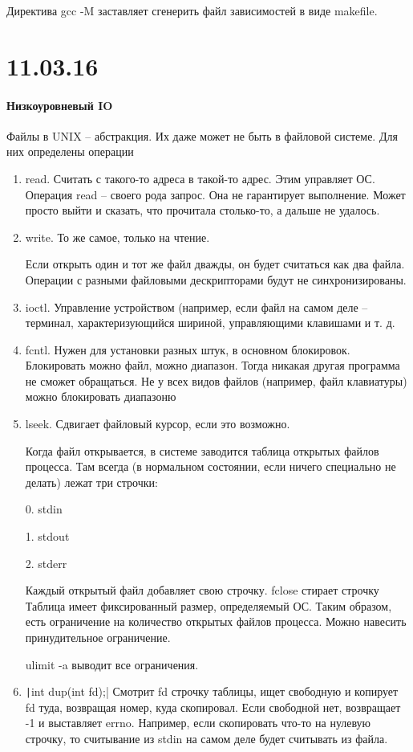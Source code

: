 \documentclass[a4paper,10pt]{article}
\newcommand{\ci}{\texttt}
\begin{document}
Директива gcc -M заставляет сгенерить файл зависимостей в виде makefile.

\section{11.03.16}
\paragraph{Низкоуровневый IO}
Файлы в UNIX -- абстракция. Их даже может не быть в файловой системе. Для них определены операции 
\begin{enumerate}
\item read. Считать с такого-то адреса в такой-то адрес. Этим управляет ОС. Операция read -- своего рода запрос. Она не гарантирует выполнение. Может просто выйти и сказать, что прочитала столько-то, а дальше не удалось.
\item write. То же самое, только на чтение.

Если открыть один и тот же файл дважды, он будет считаться как два файла. Операции с разными файловыми дескрипторами будут не синхронизированы. 
\item ioctl. Управление устройством (например, если файл на самом деле -- терминал, характеризующийся шириной, управляющими клавишами и т. д.
\item fcntl. Нужен для установки разных штук, в основном блокировок. Блокировать можно файл, можно диапазон. Тогда никакая другая программа не сможет обращаться. Не у всех видов файлов (например, файл клавиатуры) можно блокировать диапазоню
\item lseek. Сдвигает файловый курсор, если это возможно.

Когда файл открывается, в системе заводится таблица открытых файлов процесса. Там всегда (в нормальном состоянии, если ничего специально не делать) лежат три строчки:

0. stdin

1. stdout

2. stderr

Каждый открытый файл добавляет свою строчку. fclose стирает строчку
Таблица имеет фиксированный размер, определяемый ОС. Таким образом, есть ограничение на количество открытых файлов процесса. Можно навесить принудительное ограничение. 

ulimit -a выводит все ограничения.

\item \ci|int dup(int fd);| Смотрит fd строчку таблицы, ищет свободную и копирует fd туда, возвращая номер, куда скопировал. Если свободной нет, возвращает -1 и выставляет errno.
Например, если скопировать что-то на нулевую строчку, то считывание из stdin на самом деле будет считывать из файла.


\end{enumerate}
\end{document}
